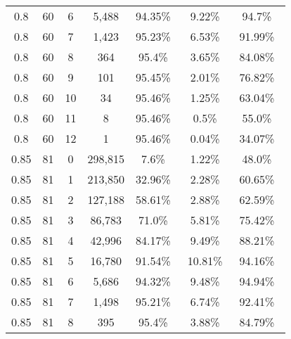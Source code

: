 \begin{figure}[!htbp]
{\begin{tabular}{ |c|c|c|c|c|c|c| }
        0.8             &60             &6            &5,488                 & 94.35\%\     & 9.22\%\               & 94.7\%\ \\
        0.8             &60             &7            &1,423                 & 95.23\%\     & 6.53\%\               & 91.99\%\ \\
        0.8             &60             &8            &364                 & 95.4\%\     & 3.65\%\               & 84.08\%\ \\
        0.8             &60             &9            &101                 & 95.45\%\     & 2.01\%\               & 76.82\%\ \\
        0.8             &60             &10            &34                 & 95.46\%\     & 1.25\%\               & 63.04\%\ \\
        0.8             &60             &11            &8                 & 95.46\%\     & 0.5\%\               & 55.0\%\ \\
        0.8             &60             &12            &1                 & 95.46\%\     & 0.04\%\               & 34.07\%\ \\
        \hline
        0.85             &81             &0            &298,815                 & 7.6\%\     & 1.22\%\               & 48.0\%\ \\
        0.85             &81             &1            &213,850                 & 32.96\%\     & 2.28\%\               & 60.65\%\ \\
        0.85             &81             &2            &127,188                 & 58.61\%\     & 2.88\%\               & 62.59\%\ \\
        0.85             &81             &3            &86,783                 & 71.0\%\     & 5.81\%\               & 75.42\%\ \\
        0.85             &81             &4            &42,996                 & 84.17\%\     & 9.49\%\               & 88.21\%\ \\
        0.85             &81             &5            &16,780                 & 91.54\%\     & 10.81\%\               & 94.16\%\ \\
        0.85             &81             &6            &5,686                 & 94.32\%\     & 9.48\%\               & 94.94\%\ \\
        0.85             &81             &7            &1,498                 & 95.21\%\     & 6.74\%\               & 92.41\%\ \\
        0.85             &81             &8            &395                 & 95.4\%\     & 3.88\%\               & 84.79\%\ \\

\end{tabular}}
\end{figure}
